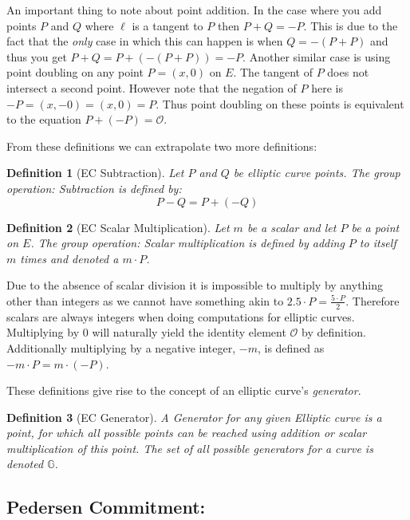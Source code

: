 \documentclass{article}
\newtheorem{definition}{Definition}[section]
\renewcommand{\O}{\mathcal{O}}
\newcommand{\G}{\mathbb{G}}
\begin{document}
An important thing to note about point addition. In the case where
you add points $P$ and $Q$ where $\ell$ is a tangent to $P$ then $P +
Q = -P$. This is due to the fact that the \textit{only} case in which
this can happen is when $Q = -(P + P)$ and thus you get $P + Q = P +
(-(P + P)) = -P$. Another similar case is using point doubling on any
point $P = (x,0)$ on $E$. The tangent of $P$ does not intersect
a second point. However note that the negation of $P$ here is $-P =
(x,-0) = (x,0) = P$. Thus point doubling on these points is equivalent
to the equation $P + (-P) = \O$.

From these definitions we can extrapolate two more definitions:

\begin{definition}[EC Subtraction]
	Let $P$ and $Q$ be elliptic curve points. The group operation:
	Subtraction is defined by:
	$$P-Q = P + (-Q)$$
\end{definition}

\begin{definition}[EC Scalar Multiplication]
	Let $m$ be a scalar and let $P$ be a point on $E$. The group
	operation: Scalar multiplication is defined by adding $P$
	to itself $m$ times and denoted a $m\cdot P$.
\end{definition}

Due to the absence of scalar division it is impossible to multiply by
anything other than integers as we cannot have something akin to $2.5
\cdot P = \frac{5\cdot P}{2}$. Therefore scalars are always integers
when doing computations for elliptic curves. Multiplying by $0$ will
naturally yield the identity element $\mathcal{O}$ by definition.
Additionally multiplying by a negative integer, ${-m}$, is defined as
$-m\cdot P = m\cdot ({-P})$.

These definitions give rise to the concept of an elliptic
curve's \textit{generator}.

\begin{definition}[EC Generator]
	A Generator for any given Elliptic curve is a point, for
	which all possible points can be reached using addition or
	scalar multiplication of this point. The set of all possible
	generators for a curve is denoted $\G$.
\end{definition}

\subsection{Pedersen Commitment:}
\end{document}
